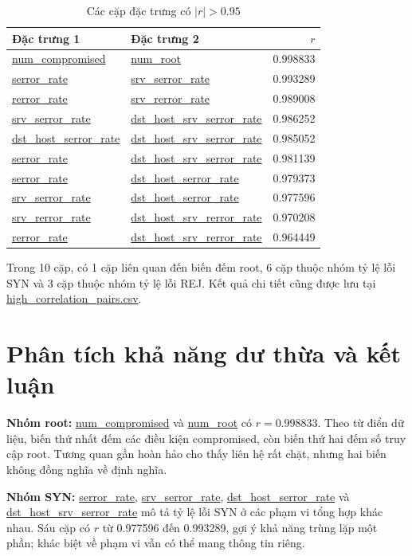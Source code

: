 \documentclass[12pt,a4paper]{article}
\begin{document}
\begin{table}[htbp]
\centering
\caption{Các cặp đặc trưng có $|r|>0.95$}
\label{tab:highcorr}
\small
\begin{tabularx}{\linewidth}{
  >{\raggedright\arraybackslash}X
  >{\raggedright\arraybackslash}X
  r}
\toprule
Đặc trưng 1 & Đặc trưng 2 & $r$\\
\midrule
\url{num_compromised} & \url{num_root} & 0.998833\\
\url{serror_rate} & \url{srv_serror_rate} & 0.993289\\
\url{rerror_rate} & \url{srv_rerror_rate} & 0.989008\\
\url{srv_serror_rate} & \url{dst_host_srv_serror_rate} & 0.986252\\
\url{dst_host_serror_rate} & \url{dst_host_srv_serror_rate} & 0.985052\\
\url{serror_rate} & \url{dst_host_srv_serror_rate} & 0.981139\\
\url{serror_rate} & \url{dst_host_serror_rate} & 0.979373\\
\url{srv_serror_rate} & \url{dst_host_serror_rate} & 0.977596\\
\url{srv_rerror_rate} & \url{dst_host_srv_rerror_rate} & 0.970208\\
\url{rerror_rate} & \url{dst_host_srv_rerror_rate} & 0.964449\\
\bottomrule
\end{tabularx}
\end{table}

Trong 10 cặp, có 1 cặp liên quan đến biến đếm root, 6 cặp thuộc nhóm tỷ lệ lỗi SYN và 3 cặp thuộc nhóm tỷ lệ lỗi REJ. Kết quả chi tiết cũng được lưu tại \url{high_correlation_pairs.csv}.

\section{Phân tích khả năng dư thừa và kết luận}
 
\hspace{0.4cm} \textbf{Nhóm root:} \url{num_compromised} và \url{num_root} có $r=0.998833$. Theo từ điển dữ liệu, biến thứ nhất đếm các điều kiện compromised, còn biến thứ hai đếm số truy cập root. Tương quan gần hoàn hảo cho thấy liên hệ rất chặt, nhưng hai biến không đồng nghĩa về định nghĩa.

\textbf{Nhóm SYN:} \url{serror_rate}, \url{srv_serror_rate}, \url{dst_host_serror_rate} và \url{dst_host_srv_serror_rate} mô tả tỷ lệ lỗi SYN ở các phạm vi tổng hợp khác nhau. Sáu cặp có $r$ từ 0.977596 đến 0.993289, gợi ý khả năng trùng lặp một phần; khác biệt về phạm vi vẫn có thể mang thông tin riêng.
\end{document}
